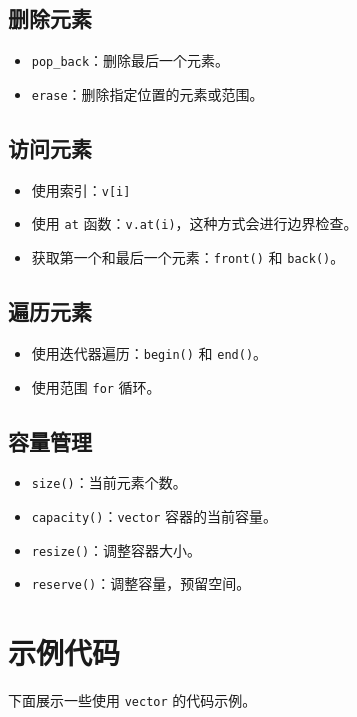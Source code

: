 \documentclass{article}
\begin{document}
\subsection{删除元素}
\begin{itemize}
    \item \texttt{pop\_back}：删除最后一个元素。
    \item \texttt{erase}：删除指定位置的元素或范围。
\end{itemize}

\subsection{访问元素}
\begin{itemize}
    \item 使用索引：\texttt{v[i]}
    \item 使用 \texttt{at} 函数：\texttt{v.at(i)}，这种方式会进行边界检查。
    \item 获取第一个和最后一个元素：\texttt{front()} 和 \texttt{back()}。
\end{itemize}

\subsection{遍历元素}
\begin{itemize}
    \item 使用迭代器遍历：\texttt{begin()} 和 \texttt{end()}。
    \item 使用范围 \texttt{for} 循环。
\end{itemize}

\subsection{容量管理}
\begin{itemize}
    \item \texttt{size()}：当前元素个数。
    \item \texttt{capacity()}：\texttt{vector} 容器的当前容量。
    \item \texttt{resize()}：调整容器大小。
    \item \texttt{reserve()}：调整容量，预留空间。
\end{itemize}

\section{示例代码}

下面展示一些使用 \texttt{vector} 的代码示例。
\end{document}
